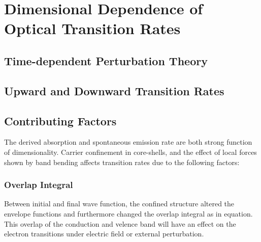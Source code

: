 \chapter{Dimensional Dependence of Optical Transition Rates} \label{RM}
 
\section{Time-dependent Perturbation Theory} \label{dust_seds}



\section{Upward and Downward Transition Rates} \label{rates}

\section{Contributing Factors} \label{factor}

The derived absorption and spontaneous emission rate are both strong function
of dimensionality. Carrier confinement in core-shells, and the effect of local
forces shown by band bending affects transition rates due to the following
factors:

\subsection{Overlap Integral}

Between initial and final wave function, the confined structure altered the
envelope functions and furthermore changed the overlap integral as in equation.
This overlap of the conduction and velence band will have an effect on the
electron transitions under electric field or external perturbation.

